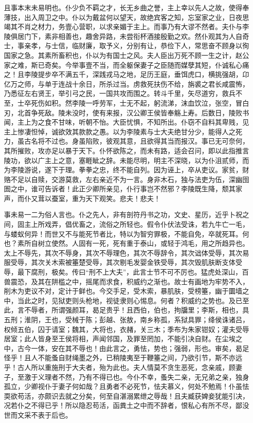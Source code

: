 \documentclass[]{article}
\begin{document}
且事本末未易明也。仆少负不羁之才，长无乡曲之誉，主上幸以先人之故，使得奉薄技，出入周卫之中。仆以为戴盆何以望天，故绝宾客之知，忘室家之业，日夜思竭其不肖之材力，务壹心营职，以求亲媚于主上。而事乃有大谬不然者。夫仆与李陵俱居门下，素非相善也，趣舍异路，未尝衔杯酒接殷勤之欢。然仆观其为人自奇士，事亲孝，与士信，临财廉，取予义，分别有让，恭俭下人，常思奋不顾身以徇国家之急。其素所畜积也，仆以为有国士之风。夫人臣出万死不顾一生之计，赵公家之难，斯已奇矣。今举事壹不当，而全躯保妻子之臣随而媒孽其短，仆诚私心痛之！且李陵提步卒不满五千，深践戎马之地，足历王庭，垂饵虎口，横挑强胡，卬亿万之师，与单于连战十余日，所杀过当。虏救死扶伤不给，旃裘之君长咸震怖，乃悉征左右贤王，举引弓之民，一国共攻而围之。转斗千里，矢尽道穷，救兵不至，士卒死伤如积。然李陵一呼劳军，士无不起，躬流涕，沫血饮泣，张空，冒白刃，北首争死敌。陵未没时，使有来报，汉公卿王侯皆奉觞上寿。后数日，陵败书闻，主上为之食不甘味，听朝不怡。大臣忧惧，不知所出。仆窃不自料其卑贱，见主上惨凄怛悼，诚欲效其款款之愚。以为李陵素与士大夫绝甘分少，能得人之死力，虽古名将不过也。身虽陷败，彼观其意，且欲得其当而报汉。事已无可奈何，其所摧败，攻亦足以暴于天下。仆怀欲陈之，而未有路，适会召问，即以此指推言陵功，欲以广主上之意，塞睚眦之辞。未能尽明，明主不深晓，以为仆沮贰师，而为李陵游说，遂下于理。拳拳之忠，终不能自列。因为诬上，卒从吏议。家贫，财赂不足以自赎，交游莫救，左右亲近不为一言。身非木石，独与法吏为伍，深幽囹圄之中，谁可告诉者！此正少卿所亲见，仆行事岂不然邪？李陵既生降，颓其家声，而仆又茸以蚕室，重为天下观笑。悲夫！悲夫！

事未易一二为俗人言也。仆之先人，非有剖符丹书之功，文史、星历，近乎卜祝之间，固主上所戏弄，倡优畜之，流俗之所轻也。假令仆伏法受诛，若九牛亡一毛，与蝼蚁何异！而世又不与能死节者比，特以为智穷罪极，不能自免，卒就死耳。何也？素所自树立使然。人固有一死，死有重于泰山，或轻于鸿毛，用之所趋异也。太上不辱先，其次不辱身，其次不辱理色，其次不辱辞令，其次诎体受辱，其次易服受辱，其次关木索被箠楚受辱，其次剔毛发婴金铁受辱，其次毁肌肤断支体受辱，最下腐刑，极矣。传曰``刑不上大夫''，此言士节不可不厉也。猛虎处深山，百兽震恐，及其在阱槛之中，摇尾而求食，积威约之渐也。故士有画地为牢势不入，削木为吏议不对，定计于鲜也。今交手足，受木索，暴肌肤，受榜箠，幽于圜墙之中，当此之时，见狱吏则头枪地，视徒隶则心惕息。何者？积威约之势也。及已至此，言不辱者，所谓强颜耳，曷足贵乎！且西伯，伯也，拘牖里；李斯，相也，具五刑；淮阴，王也，受械于陈；彭越、张敖，南乡称孤，系狱具罪；绛侯诛诸吕，权倾五伯，囚于请室；魏其，大将也，衣赭，关三木；季布为朱家钳奴；灌夫受辱居室；此人皆身至王侯将相，声闻邻国，及罪至罔加，不能引决自财。在尘埃之中，古今一体，安在其不辱也！由此言之，勇怯，势也；强弱，形也。审矣，曷足怪乎！且人不能蚤自财绳墨之外，已稍陵夷至于鞭箠之间，乃欲引节，斯不亦远乎！古人所以重施刑于大夫者，殆为此也。夫人情莫不贪生恶死，念亲戚，顾妻子，至激于义理者不然，乃有不得已也。今仆不幸，蚤失二亲，无兄弟之亲，独身孤立，少卿视仆于妻子何如哉？且勇者不必死节，怯夫慕义，何处不勉焉！仆虽怯耎欲苟活，亦颇识去就之分矣，何至自湛溺累绁之辱哉！且夫臧获婢妾犹能引决，况若仆之不得已乎！所以隐忍苟活，函粪土之中而不辞者，恨私心有所不尽，鄙没世而文采不表于后也。
\end{document}
